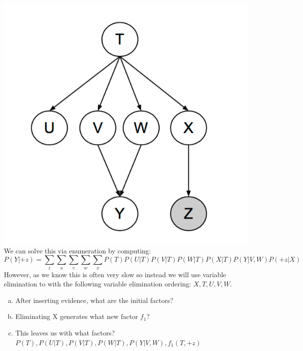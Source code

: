 \documentclass[11pt]{article}
\newif\ifsol
\begin{document}
\begin{enumerate}
    \includegraphics[scale=0.4]{figs/elimnet}\\
    We can solve this via enumeration by computing:
    $$P(Y|+z) = \sum_t \sum_u \sum_v \sum_w \sum_x P(T)P(U|T)P(V|T)P(W|T)P(X|T)P(Y|V,W)P(+z|X)$$
    However, as we know this is often very slow so instead we will use variable elimination to with the following variable elimination ordering: $X, T, U, V, W$.
    \begin{enumerate}[a)]
        \item After inserting evidence, what are the initial factors?\\
        \ifsol
            {\color{blue} $P(T),P(U|T),P(V|T),P(W|T),P(X|T),P(Y|V,W),P(+z|X)$}
        \else
            \vspace{1pt}
        \fi
        \item Eliminating X generates what new factor $f_1$?\\
        \ifsol
            {\color{blue} $f_1(T, +z) =  \sum_x P (x|T )P (+z|x)$}
        \else
            \vspace{1pt}
        \fi
        \item This leaves us with what factors?\\
        \ifsol
            {\color{blue} $P(T),P(U|T),P(V|T),P(W|T),P(Y|V,W),f_1(T,+z)$}
        \else
            \vspace{1pt}

\end{enumerate}
\end{enumerate}
\end{document}
